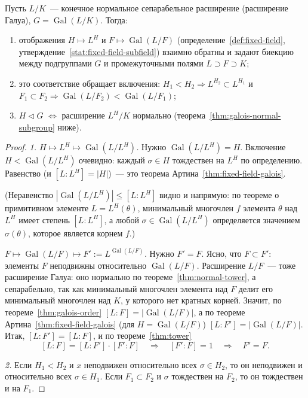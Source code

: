 \documentclass[12pt]{article}
\begin{document}
	\begin{theorem}\label{thm:galois-fundamental}
		Пусть $L/K$~--- конечное нормальное сепарабельное расширение (расширение Галуа), $G = \operatorname{Gal}(L/K)$. Тогда:
		\begin{enumerate}
			\item отображения $H \mapsto L^H$ и $F \mapsto \operatorname{Gal}(L/F)$ (определение~\ref{def:fixed-field}, утверждение~\ref{stat:fixed-field-subfield}) взаимно обратны и задают биекцию между подгруппами $G$ и промежуточными полями $L \supset F \supset K$;
			\item это соответствие обращает включения: $H_1 < H_2 \Rightarrow L^{H_2} \subset L^{H_1}$ и $F_1 \subset F_2 \Rightarrow \operatorname{Gal}(L/F_2) < \operatorname{Gal}(L/F_1)$;
			\item $H \vartriangleleft G$ $\Leftrightarrow$ расширение $L^H/K$ нормально (теорема~\ref{thm:galois-normal-subgroup} ниже).
		\end{enumerate}
	\end{theorem}
	\begin{proof}
		\emph{1. $H \mapsto L^H \mapsto \operatorname{Gal}(L/L^H)$.} Нужно $\operatorname{Gal}(L/L^H) = H$. Включение $H < \operatorname{Gal}(L/L^H)$ очевидно: каждый $\sigma \in H$ тождествен на $L^H$ по определению. Равенство (и $[L:L^H] = |H|$)~--- это теорема Артина~\ref{thm:fixed-field-galois}.

		(Неравенство $|\operatorname{Gal}(L/L^H)| \leqslant [L:L^H]$ видно и напрямую: по теореме о примитивном элементе $L = L^H(\theta)$, минимальный многочлен $f$ элемента $\theta$ над $L^H$ имеет степень $[L:L^H]$, а любой $\sigma \in \operatorname{Gal}(L/L^H)$ определяется значением $\sigma(\theta)$, которое является корнем $f$.)

		\emph{$F \mapsto \operatorname{Gal}(L/F) \mapsto F' := L^{\operatorname{Gal}(L/F)}$.} Нужно $F' = F$. Ясно, что $F \subset F'$: элементы $F$ неподвижны относительно $\operatorname{Gal}(L/F)$. Расширение $L/F$~--- тоже расширение Галуа: оно нормально по теореме~\ref{thm:normal-tower}, а сепарабельно, так как минимальный многочлен элемента над $F$ делит его минимальный многочлен над $K$, у которого нет кратных корней. Значит, по теореме~\ref{thm:galois-order} $[L:F] = |\operatorname{Gal}(L/F)|$, а по теореме Артина~\ref{thm:fixed-field-galois} (для $H = \operatorname{Gal}(L/F)$) $[L:F'] = |\operatorname{Gal}(L/F)|$. Итак, $[L:F'] = [L:F]$, и по теореме~\ref{thm:tower}
		\[
			[L:F] = [L:F'] \cdot [F':F] \quad \Longrightarrow \quad [F':F] = 1 \quad \Longrightarrow \quad F' = F.
		\]

		\emph{2.} Если $H_1 < H_2$ и $x$ неподвижен относительно всех $\sigma \in H_2$, то он неподвижен и относительно всех $\sigma \in H_1$. Если $F_1 \subset F_2$ и $\sigma$ тождествен на $F_2$, то он тождествен и на $F_1$.
	\end{proof}
\end{document}
